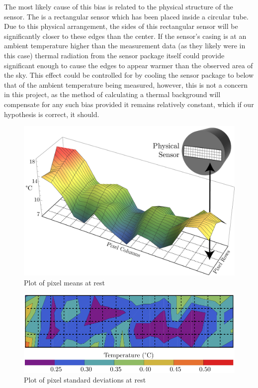 \documentclass[../thesis/thesis.tex]{subfiles}
\begin{document}
The most likely cause of this bias is related to the physical structure of the sensor. The \mlx is a rectangular sensor which has been placed inside a circular tube. Due to this physical arrangement, the sides of this rectangular sensor will be significantly closer to these edges than the center. If the sensor's casing is at an ambient temperature higher than the measurement data (as they likely were in this case) thermal radiation from the sensor package itself could provide significant enough to cause the edges to appear warmer than the observed area of the sky. This effect could be controlled for by cooling the sensor package to below that of the ambient temperature being measured, however, this is not a concern in this project, as the method of calculating a thermal background will compensate for any such bias provided it remains relatively constant, which if our hypothesis is correct, it should.

\begin{figure}
\centering
\includegraphics[width=\textwidth]{../diagrams/rest-avg-embed.pdf}
\caption{Plot of pixel means at rest}
\label{fig:meanplot}
\end{figure}

\begin{figure}
\centering
\includegraphics[width=\textwidth]{../diagrams/stddev-contour.pdf}
\caption{Plot of pixel standard deviations at rest}
\label{fig:stdplot}
\end{figure}
\end{document}
